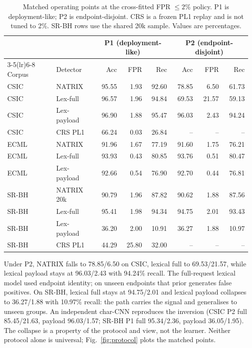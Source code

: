 \documentclass[conference]{IEEEtran}
\begin{document}
\begin{table}[t]
\caption{Matched operating points at the cross-fitted FPR $\le 2\%$ policy. P1 is deployment-like; P2 is endpoint-disjoint. CRS is a frozen PL1 replay and is not tuned to 2\%. SR-BH rows use the shared 20k sample. Values are percentages.}
\label{tab:detectors}
\centering
\scriptsize
\setlength{\tabcolsep}{4pt}
\begin{tabular}{@{}llrrrrrr@{}}
\toprule
 & & \multicolumn{3}{c}{P1 (deployment-like)} & \multicolumn{3}{c}{P2 (endpoint-disjoint)}\\
\cmidrule(lr){3-5}\cmidrule(lr){6-8}
Corpus & Detector & Acc & FPR & Rec & Acc & FPR & Rec\\
\midrule
CSIC & NATRIX & 95.55 & 1.93 & 92.60 & 78.85 & 6.50 & 61.73\\
CSIC & Lex-full & 96.57 & 1.96 & 94.84 & 69.53 & 21.57 & 59.13\\
CSIC & Lex-payload & 96.90 & 1.88 & 95.47 & 96.03 & 2.43 & 94.24\\
CSIC & CRS PL1 & 66.24 & 0.03 & 26.84 & -- & -- & --\\
ECML & NATRIX & 91.96 & 1.67 & 77.19 & 91.60 & 1.75 & 76.21\\
ECML & Lex-full & 93.93 & 0.43 & 80.85 & 93.76 & 0.51 & 80.47\\
ECML & Lex-payload & 92.66 & 0.54 & 76.90 & 92.70 & 0.44 & 76.81\\
SR-BH & NATRIX 20k & 90.79 & 1.96 & 87.82 & 90.62 & 1.88 & 87.56\\
SR-BH & Lex-full & 95.41 & 1.98 & 94.34 & 94.75 & 2.01 & 93.43\\
SR-BH & Lex-payload & 36.20 & 2.00 & 10.91 & 36.27 & 1.88 & 10.97\\
SR-BH & CRS PL1 & 44.29 & 25.80 & 32.00 & -- & -- & --\\
\bottomrule
\end{tabular}
\end{table}

Under P2, NATRIX falls to 78.85/6.50 on CSIC, lexical full to 69.53/21.57, while lexical payload stays at 96.03/2.43 with 94.24\% recall. The full-request lexical model used endpoint identity; on unseen endpoints that prior generates false positives. On SR-BH, lexical full stays at 94.75/2.01 and lexical payload collapses to 36.27/1.88 with 10.97\% recall: the path carries the signal and generalises to unseen groups. An independent char-CNN reproduces the inversion (CSIC P2 full 85.45/21.63, payload 96.03/1.57; SR-BH P1 full 95.34/2.36, payload 36.05/1.95). The collapse is a property of the protocol and view, not the learner. Neither protocol alone is universal; Fig.~\ref{fig:protocol} plots the matched points.
\end{document}
